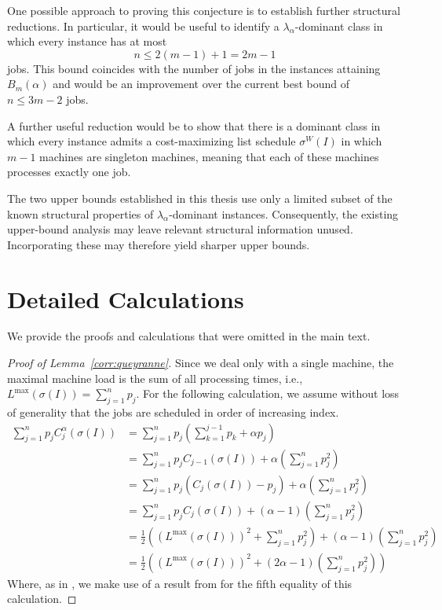 \documentclass[%
english, titlepage=false %
]{./tum-templates/book/tumbook}
\newcommand{\machLoadMax}{L^{\max}(\sigma(I))}
\begin{document}
One possible approach to proving this conjecture is to establish further
structural reductions. In particular, it would be useful to identify a
\(\lambda_{\alpha}\)-dominant class in which every instance has at most
\[
    n\leq 2(m-1)+1=2m-1
\]
jobs. This bound coincides with the number of jobs in the instances attaining
\(B_m(\alpha)\) and would be an improvement over the current best bound of \(n\leq 3m-2\) jobs. 

A further useful reduction would be to show that there is a dominant class in which 
every instance admits a cost-maximizing list schedule
\(\sigma^{W}(I)\) in which \(m-1\) machines are singleton machines, meaning
that each of these machines processes exactly one job.

The two upper bounds established in this thesis use only a limited subset of
the known structural properties of \(\lambda_{\alpha}\)-dominant instances.
Consequently, the existing upper-bound analysis may leave relevant structural
information unused. Incorporating these may therefore yield sharper upper bounds.
\appendix

\chapter{Detailed Calculations}
\label{app:detailed-calculations}
We provide the proofs and calculations that were omitted in the main text.
\label{app:proof-queyranne}
\begin{proof}[Proof of Lemma~\ref{corr:queyranne}]
Since we deal only with a single machine, the maximal machine load is the sum of all processing times, i.e., $\machLoadMax=\sum_{j=1}^n p_j$.
For the following calculation, we assume without loss of generality that the jobs are scheduled
in order of increasing index.
\[
\begin{aligned}
        \sum_{j=1}^n p_jC_j^{\alpha}(\sigma(I))
        &=
        \sum_{j=1}^n p_j\left(\sum_{k=1}^{j-1} p_k +\alpha p_j \right)                       \\
        &=
        \sum_{j=1}^n p_jC_{j-1}(\sigma(I))+\alpha\left(\sum_{j=1}^n p_j^2  \right)                   \\
        &=
        \sum_{j=1}^n p_j(C_j(\sigma(I))-p_j)+\alpha\left(\sum_{j=1}^n p_j^2  \right)                 \\
        &=
        \sum_{j=1}^n p_jC_j(\sigma(I))+(\alpha-1)\left(\sum_{j=1}^n p_j^2  \right)                      \\
        &=
        \frac12\left((\machLoadMax)^2+\sum_{j=1}^n p_j^2\right)+(\alpha-1)\left(\sum_{j=1}^n p_j^2  \right)\\
        &=
        \frac12\left((\machLoadMax)^2+(2\alpha-1)\left(\sum_{j=1}^n p_j^2  \right) \right)
\end{aligned}
\]
Where, as in \cite{Schwiegelshohn:2011}, we make use of a result from \cite{queyranne1993structure} for the fifth equality of this calculation.
\end{proof}
\end{document}
